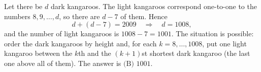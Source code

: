 Let there be $d$ dark kangaroos. The light kangaroos correspond one-to-one to the numbers $8,9,\dots,d$, so there are $d-7$ of them. Hence
\[
d+(d-7)=2009\quad\Longrightarrow\quad d=1008,
\]
and the number of light kangaroos is $1008-7=1001$. The situation is possible: order the dark kangaroos by height and, for each $k=8,\dots,1008$, put one light kangaroo between the $k$th and the $(k+1)$st shortest dark kangaroo (the last one above all of them). The answer is $\boxed{\text{(B) } 1001}$.
